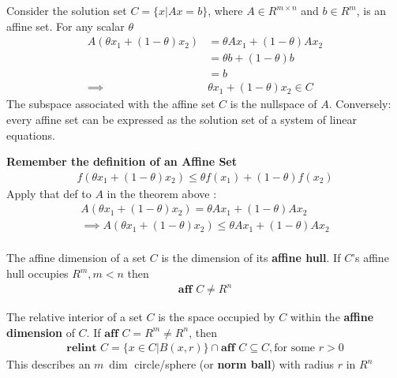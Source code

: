 \documentclass{article}
\begin{document}
\begin{theorem}
  \label{theo:soln_lineq_is_affine}
  Consider the solution set $C=\{x|Ax=b\}$, where $A\in R^{m\times n}$ and
  $b\in R^m$, is an affine set.  For any scalar $\theta$
  \begin{align*}
    A(\theta x_1+(1-\theta)x_2) & =\theta Ax_1+(1-\theta)Ax_2   \\
                                & =\theta b+(1-\theta)b         \\
                                & =b                            \\
    \implies                    & \theta x_1+(1-\theta)x_2\in C
  \end{align*}
  The subspace associated with the affine set $C$ is the nullspace of $A$.
  Conversely: every affine set can be expressed as the solution set of a system
  of linear equations.
\end{theorem}
\begin{addmargin}[2em]{0em}
  \textbf{Remember the definition of an Affine Set}
  \begin{align}
    f(\theta x_1+(1-\theta)x_2)\leq \theta f(x_1)+(1-\theta)f(x_2)
  \end{align}
  Apply that def to $A$ in the theorem above :
  \begin{align*}
    A(\theta x_1+(1-\theta)x_2)=\theta Ax_1+(1-\theta)Ax_2\\
    \implies A(\theta x_1+(1-\theta)x_2)\leq\theta Ax_1+(1-\theta)Ax_2\\
  \end{align*}
\end{addmargin}
\begin{definition}
  The affine dimension of a set $C$ is the dimension of its \textbf{affine hull}.
  If $C$'s affine hull occupies $R^m,m<n$ then
  \begin{align}
      \textbf{aff }C\neq R^n
  \end{align}
\end{definition}
\begin{definition}
  The relative interior of a set $C$ is the space occupied by $C$ within the
  \textbf{affine dimension} of $C$.  If $\textbf{aff }C=R^m\neq R^n$, then
  \begin{align}
    \textbf{relint }C=\{x\in C|B(x,r)\}\cap \textbf{aff }C\subseteq C,\text{for some }r>0
  \end{align}
  This describes an $m~\dim$ circle/sphere (or \textbf{norm ball}) with radius $r$ in $R^n$
\end{definition}
\end{document}
